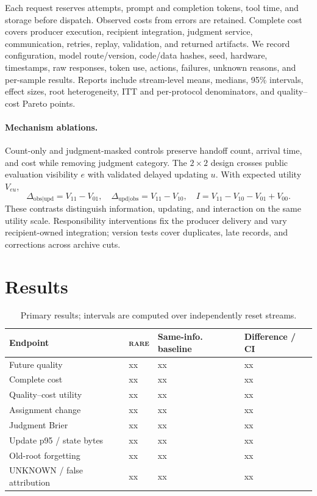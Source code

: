 \documentclass[sigconf,anonymous]{aamas}
\newcommand{\rare}{\textsc{rare}}
\begin{document}
Each request reserves attempts, prompt and completion tokens, tool time, and storage before dispatch. Observed costs from errors are retained. Complete cost covers producer execution, recipient integration, judgment service, communication, retries, replay, validation, and returned artifacts. We record configuration, model route/version, code/data hashes, seed, hardware, timestamps, raw responses, token use, actions, failures, unknown reasons, and per-sample results. Reports include stream-level means, medians, 95\% intervals, effect sizes, root heterogeneity, ITT and per-protocol denominators, and quality--cost Pareto points.

\paragraph{Mechanism ablations.} Count-only and judgment-masked controls preserve handoff count, arrival time, and cost while removing judgment category. The $2\times2$ design crosses public evaluation visibility $e$ with validated delayed updating $u$. With expected utility $V_{eu}$,
\begin{equation}
 \Delta_{\mathrm{obs}|\mathrm{upd}}=V_{11}-V_{01},\quad
 \Delta_{\mathrm{upd}|\mathrm{obs}}=V_{11}-V_{10},\quad
 I=V_{11}-V_{10}-V_{01}+V_{00}.
\label{eq:factorial}
\end{equation}
These contrasts distinguish information, updating, and interaction on the same utility scale. Responsibility interventions fix the producer delivery and vary recipient-owned integration; version tests cover duplicates, late records, and corrections across archive cuts.

\section{Results}
\begin{table}[t]
\centering\scriptsize
\setlength{\tabcolsep}{2.2pt}
\begin{tabular}{p{}p{}p{}p{}}
\toprule
Endpoint & \rare{} & Same-info. baseline & Difference / CI \\
\midrule
Future quality & xx & xx & xx \\
Complete cost & xx & xx & xx \\
Quality--cost utility & xx & xx & xx \\
Assignment change & xx & xx & xx \\
Judgment Brier & xx & xx & xx \\
Update p95 / state bytes & xx & xx & xx \\
Old-root forgetting & xx & xx & xx \\
UNKNOWN / false attribution & xx & xx & xx \\
\bottomrule
\end{tabular}
\caption{Primary results; intervals are computed over independently reset streams.}
\label{tab:results}
\end{table}
\end{document}
